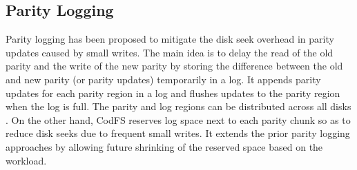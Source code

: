 
\subsection{Parity Logging}

Parity logging \cite{chen94,stodolsky93} has been proposed to mitigate the disk
seek overhead in parity updates caused by small writes. The main idea is to
delay the read of the old parity and the write of the new parity by storing the
difference between the old and new parity (or parity updates) temporarily in a
log. It appends parity updates for each parity region in a log and flushes
updates to the parity region when the log is full.  The parity and log regions
can be distributed across all disks \cite{stodolsky93}.  On the other hand,
CodFS reserves log space next to each parity chunk so as to reduce disk seeks
due to frequent small writes.  It extends the prior parity logging approaches by
allowing future shrinking of the reserved space based on the workload. 



